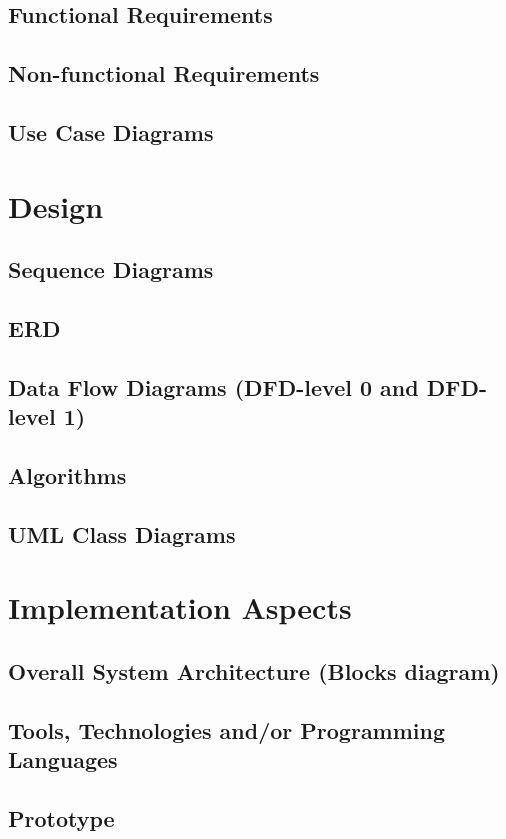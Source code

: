 \documentclass{book}
\begin{document}
		\section{Functional Requirements}
		
		\section{Non-functional Requirements}
		
		\section{Use Case Diagrams}
	
	\chapter{Design}
		\section{Sequence Diagrams}
		
		\section{ERD}
		
		\section{Data Flow Diagrams (DFD-level 0 and DFD-level 1)}
		
		\section{Algorithms}
		
		\section{UML Class Diagrams}
	
	\chapter{Implementation Aspects}
		\section{Overall System Architecture (Blocks diagram)}
		
		\section{Tools, Technologies and/or Programming Languages}
		
		\section{Prototype}
	
\end{document}
